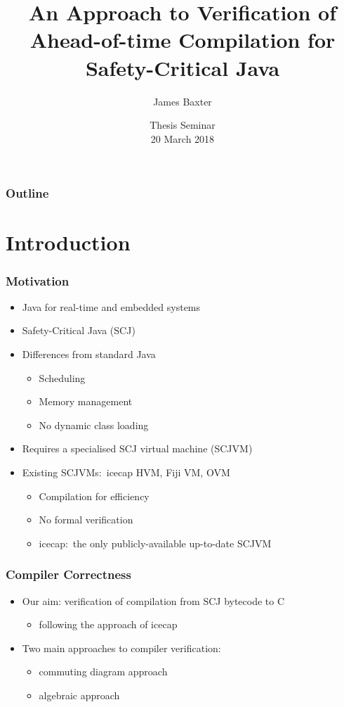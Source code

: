 \documentclass{beamer}
\title[An Approach to Verification of Ahead-of-time Compilation for
  SCJ]{An Approach to Verification of\\Ahead-of-time Compilation for\\
  Safety-Critical Java}
\author{James Baxter}
\date[2018-03-20]{Thesis Seminar\\20 March 2018}
\begin{document}
\frame[plain]{\titlepage}

\begin{frame}
\frametitle{Outline}
\tableofcontents
\end{frame}

\section{Introduction}

\begin{frame}
  \frametitle{Motivation}
  \begin{itemize}
  \item Java for real-time and embedded systems
  \item Safety-Critical Java (SCJ)
  \item Differences from standard Java
    \begin{itemize}
    \item Scheduling
    \item Memory management
    \item No dynamic class loading
    \end{itemize}
  \item Requires a specialised SCJ virtual machine (SCJVM)
  \item Existing SCJVMs:~icecap HVM, Fiji VM, OVM
    \begin{itemize}
    \item Compilation for efficiency
    \item No formal verification
    \item icecap:~the only publicly-available up-to-date SCJVM
    \end{itemize}
  \end{itemize}
\end{frame}

\begin{frame}
  \frametitle{Compiler Correctness}
  \begin{itemize}
  \item Our aim: verification of compilation from SCJ bytecode to C
    \begin{itemize}
    \item following the approach of icecap
    \end{itemize}
  \item Two main approaches to compiler verification:
    \begin{itemize}
    \item commuting diagram approach
    \item algebraic approach 
    \end{itemize}
  \end{itemize}
\end{frame}
\end{document}
